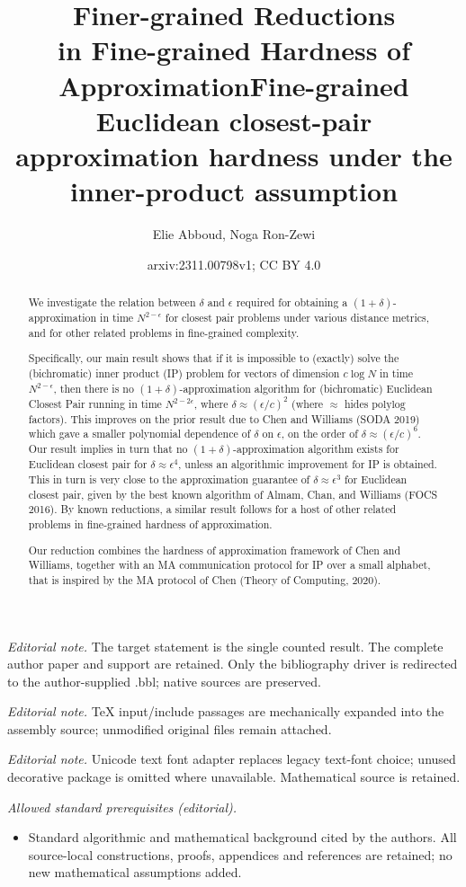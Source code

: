 \documentclass[11pt]{article}
\title{Finer-grained Reductions \\ in Fine-grained Hardness of Approximation}
\author{
Elie Abboud {\hskip 5em\relax}
Noga Ron-Zewi\thanks{Research of both authors supported in part
    by ISF grant 735/20 and by the European Union (ERC, ECCC, 101076663). Views and opinions expressed are however those of the author(s) only and do not necessarily reflect those of the European Union or the European Research Council. Neither the European Union nor the granting authority can be held responsible for them.} \\ 
Department of Computer Science, University of Haifa \\ \texttt{}\qquad  \texttt{eliabboud1000@gmail.com, noga@cs.haifa.ac.il}
}
\date{}
\title{Fine-grained Euclidean closest-pair approximation hardness under the inner-product assumption}
\author{Elie Abboud, Noga Ron-Zewi}
\date{arxiv:2311.00798v1; CC BY 4.0}
\theoremstyle{plain}
\theoremstyle{remark}
\newcommand{\polylog}{\mathrm{polylog}}
\begin{document}
\maketitle
\noindent\textit{Editorial note.} The target statement is the single counted result. The complete author paper and support are retained. Only the bibliography driver is redirected to the author-supplied .bbl; native sources are preserved.\par\medskip
\noindent\textit{Editorial note.} TeX input/include passages are mechanically expanded into the assembly source; unmodified original files remain attached.\par\medskip
\noindent\textit{Editorial note.} Unicode text font adapter replaces legacy text-font choice; unused decorative package is omitted where unavailable. Mathematical source is retained.\par\medskip
\noindent\textit{Allowed standard prerequisites (editorial).}\begin{itemize}
\item Standard algorithmic and mathematical background cited by the authors. All source-local constructions, proofs, appendices and references are retained; no new mathematical assumptions added.
\end{itemize}\medskip

\begin{abstract}

We investigate the relation between $\delta$ and $\epsilon$ required for obtaining a $(1+\delta)$-approximation in time $N^{2-\epsilon}$ for closest pair problems under various distance metrics, and for other related problems in fine-grained complexity. 

Specifically, our main result shows that  if it is impossible to (exactly) solve the  (bichromatic) inner product (IP) problem for vectors of dimension $c \log N$ in time $N^{2-\epsilon}$, then there is no 
$(1+\delta)$-approximation algorithm for (bichromatic) Euclidean Closest Pair running in time $N^{2-2\epsilon}$, where 
$\delta \approx (\epsilon/c)^2$ (where $\approx$ hides $\polylog$ factors). This improves on the prior result due to Chen and Williams (SODA 2019) which gave a smaller polynomial dependence  of $\delta$ on $\epsilon$, on the order of $\delta \approx (\epsilon/c)^6$.
Our result implies in turn that no $(1+\delta)$-approximation algorithm exists for Euclidean closest pair for $\delta \approx \epsilon^4$,  unless an algorithmic improvement for IP is obtained. This in turn is  very close to the  approximation guarantee of $\delta \approx \epsilon^3$ for  Euclidean closest pair, given by the best known algorithm of Almam, Chan, and Williams (FOCS 2016).
By known reductions, a similar result follows for a host of other related problems in fine-grained hardness of approximation. 

Our reduction combines the hardness of approximation framework of Chen and Williams, together with an MA communication protocol for IP over a small alphabet, that is inspired by the MA protocol of Chen (Theory of Computing, 2020).
\end{abstract}
\end{document}
